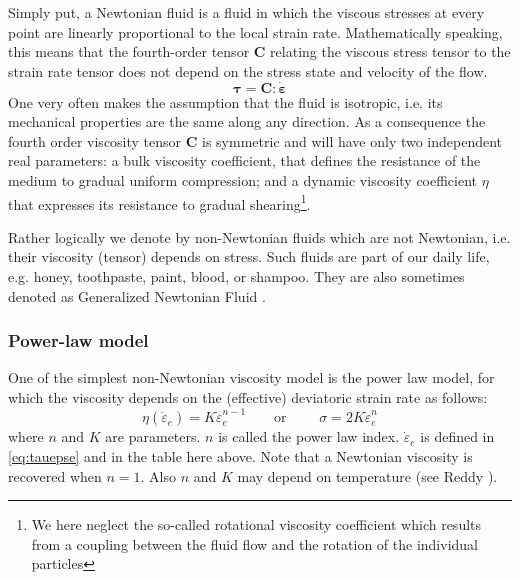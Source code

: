 Simply put, a Newtonian fluid is a fluid in which the viscous stresses at 
every point are linearly proportional 
to the local strain rate.
Mathematically speaking, this means that the fourth-order tensor ${\bm C}$ relating the viscous stress 
tensor to the strain rate tensor does not depend on the stress state and velocity of the flow.
\begin{equation}
{\bm \tau}={\bm C} : \dot{\bm \varepsilon}
\end{equation}
One very often makes the assumption that the fluid is isotropic, i.e. its mechanical properties are the 
same along any direction. As a consequence the fourth order viscosity tensor 
${\bm C}$ is symmetric and will have only two independent real parameters: 
a bulk viscosity coefficient, that defines the resistance of the medium to gradual uniform compression; 
and a dynamic viscosity coefficient $\eta$ that expresses its resistance to gradual 
shearing\footnote{We here neglect the so-called rotational viscosity coefficient which results 
from a coupling between the fluid flow and the rotation of the individual particles}.

Rather logically we denote by non-Newtonian fluids which are not Newtonian, i.e. their viscosity (tensor)
depends on stress. Such fluids are part of our daily life, e.g. honey, toothpaste, paint, blood, or shampoo.
They are also sometimes denoted as Generalized Newtonian Fluid . 

\subsubsection{Power-law model \label{ss:powerlaw}} 

One of the simplest non-Newtonian viscosity model is the power law model, 
for which the viscosity depends on the (effective) deviatoric strain rate as follows:
\begin{equation}
\eta(\dot{\varepsilon}_e) = K \dot{\varepsilon}_{e}^{n-1}
\qquad \text{or } \qquad
\sigma = 2 K \dot{\varepsilon}_e ^n 
\end{equation}
where $n$ and $K$ are parameters. $n$ is called the power law index. $\dot{\varepsilon}_e$ 
is defined in  \eqref{eq:tauepse} and in the table here above. 
Note that a Newtonian viscosity is recovered when $n=1$. Also $n$ and $K$ may depend on temperature
(see Reddy  \cite[p339]{reddybook2}).

